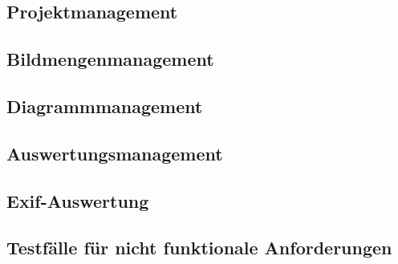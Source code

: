 \begin{description}
	\subsection{Projektmanagement}
	\begin{description}
		\begin{itemize}
		\end{itemize}
	\end{description}
	
	\subsection{Bildmengenmanagement}
	\begin{description}
		\begin{itemize}
		\end{itemize}
	\end{description}
	
	\subsection{Diagrammmanagement}
	\begin{description}
		\begin{itemize}
		\end{itemize}
	\end{description}
	
	\subsection{Auswertungsmanagement}
	\begin{description}
		\begin{itemize}
		\end{itemize}
	\end{description}
	
	\subsection{Exif-Auswertung}
	\begin{description}
		\begin{itemize}
		\end{itemize}
	\end{description}
	

	
	\end{description}
	\subsection{Testfälle für nicht funktionale Anforderungen}
	
